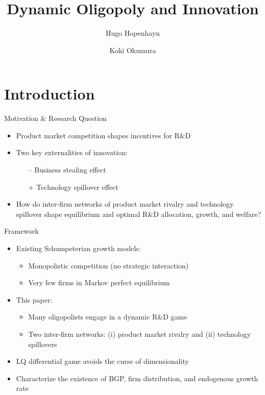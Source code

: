 \documentclass[
  10pt,               %
  aspectratio=169,     %
]{beamer}
\title{Dynamic Oligopoly and Innovation}
\author{Hugo Hopenhayn \and Koki Okumura}
\institute{\normalsize UCLA}
\date{}
\theoremstyle{plain}
\begin{document}
\begin{frame}
  \titlepage
\end{frame}

\section{Introduction}

\begin{frame}{Motivation \& Research Question}
  \begin{itemize}
    \item Product market competition shapes incentives for R\&D
          \medskip{}
    \item Two key externalities of innovation:
          \begin{itemize}
            \item[--] Business stealing effect
            \item[+] Technology spillover effect
          \end{itemize}
          \medskip{} \pause
    \item How do inter-firm networks of product market rivalry and technology spillover shape equilibrium and optimal R\&D allocation, growth, and welfare?
  \end{itemize}
\end{frame}

\begin{frame}{Framework}
  \begin{itemize}
    \item Existing Schumpeterian growth models:
          \begin{itemize}
            \item Monopolistic competition (no strategic interaction)
            \item Very few firms in Markov perfect equilibrium
          \end{itemize}
          \medskip{} \pause
    \item This paper:
          \begin{itemize}
            \item Many oligopolists engage in a dynamic R\&D game
            \item Two inter-firm networks: (i) product market rivalry and (ii) technology spillovers
          \end{itemize}
          \medskip{} \pause
    \item LQ differential game avoids the curse of dimensionality
          \medskip{}
    \item Characterize the existence of BGP, firm distribution, and endogenous growth rate
  \end{itemize}
\end{frame}
\end{document}
